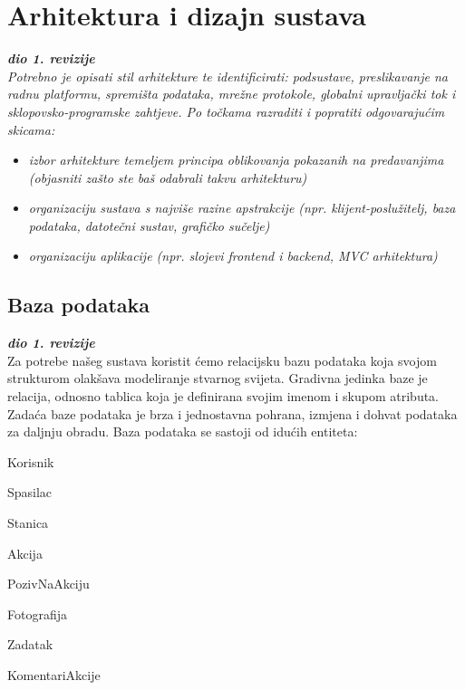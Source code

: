 \chapter{Arhitektura i dizajn sustava}
		
		\textbf{\textit{dio 1. revizije}}\\

		\textit{ Potrebno je opisati stil arhitekture te identificirati: podsustave, preslikavanje na radnu platformu, spremišta podataka, mrežne protokole, globalni upravljački tok i sklopovsko-programske zahtjeve. Po točkama razraditi i popratiti odgovarajućim skicama:}
	\begin{itemize}
		\item 	\textit{izbor arhitekture temeljem principa oblikovanja pokazanih na predavanjima (objasniti zašto ste baš odabrali takvu arhitekturu)}
		\item 	\textit{organizaciju sustava s najviše razine apstrakcije (npr. klijent-poslužitelj, baza podataka, datotečni sustav, grafičko sučelje)}
		\item 	\textit{organizaciju aplikacije (npr. slojevi frontend i backend, MVC arhitektura) }		
	\end{itemize}

	
		

		

				
		\section{Baza podataka}
			
			\textbf{\textit{dio 1. revizije}}\\
			
		\text Za potrebe našeg sustava koristit ćemo relacijsku bazu podataka koja svojom strukturom olakšava modeliranje stvarnog svijeta. Gradivna jedinka baze je relacija, odnosno tablica koja je definirana svojim imenom i skupom atributa. Zadaća baze podataka je brza i jednostavna pohrana, izmjena i dohvat podataka za daljnju obradu.
		\text Baza podataka se sastoji od idućih entiteta:
		\begin{packed_item}
			
			\item Korisnik
			\item Spasilac
			\item Stanica
			\item Akcija
			\item PozivNaAkciju
			\item Fotografija
			\item Zadatak
			\item KomentariAkcije

		\end{packed_item}
		
